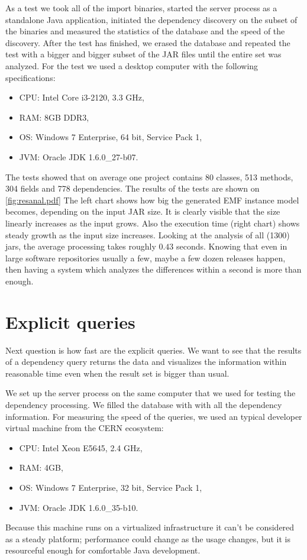 As a test we took all of the import binaries, started the server process as a
standalone Java application, initiated the dependency discovery on the subset of
the binaries and measured the statistics of the database and the speed of the
discovery. After the test has finished, we erased the database and repeated the
test with a bigger and bigger subset of the JAR files until the entire set was
analyzed. For the test we used a desktop computer with the following
specifications:
\begin{itemize}
  \item CPU: Intel Core i3-2120, 3.3 GHz,
  \item RAM: 8GB DDR3,
  \item OS: Windows 7 Enterprise, 64 bit, Service Pack 1,
  \item JVM: Oracle JDK 1.6.0\_27-b07.
\end{itemize}
The tests showed that on average one project contains 80 classes, 513 methods, 304 fields and 778 dependencies. 
The results of the tests are shown on \autoref{fig:resanal.pdf}
The left chart shows how big the generated EMF instance model becomes, depending
on the input JAR size. It is clearly visible that the size linearly increases as
the input grows. Also the execution time (right chart) shows steady growth as
the input size increases. Looking at the analysis
 of all (1300) jars, the average processing takes roughly $0.43$ seconds.
Knowing that even in large software repositories usually a few, maybe a few
dozen releases happen, then having a system which analyzes the differences
within a second is more than enough.

\section{Explicit queries}
\label{sect:explqueries}
Next question is how fast are the explicit queries. We want to see that the
results of a dependency query returns the data and visualizes the information
within reasonable time even when the result set is bigger than usual. 

We set up the server process on the same computer that we used for testing the
dependency processing. We filled the database with with all the dependency
information. For measuring the speed of the queries, we used an typical
developer virtual machine from the CERN ecosystem:
\begin{itemize}
  \item CPU: Intel Xeon E5645, 2.4 GHz,
  \item RAM: 4GB,
  \item OS: Windows 7 Enterprise, 32 bit, Service Pack 1,
  \item JVM: Oracle JDK 1.6.0\_35-b10.
\end{itemize}
Because this machine runs on a virtualized infrastructure it can't be considered
as a steady platform; performance could change as the usage changes, but it is
resourceful enough for comfortable Java development.

